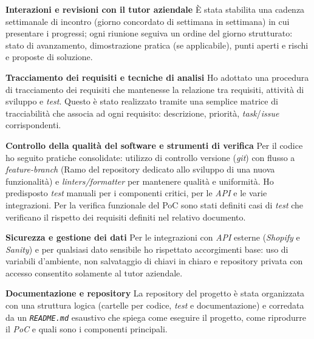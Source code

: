 \medskip
\noindent\textbf{Interazioni e revisioni con il tutor aziendale}
È stata stabilita una cadenza settimanale di incontro (giorno concordato di settimana in settimana) in cui presentare i progressi; 
ogni riunione seguiva un ordine del giorno strutturato: stato di avanzamento, dimostrazione pratica (se applicabile), punti aperti e rischi e proposte di soluzione.

\medskip
\noindent\textbf{Tracciamento dei requisiti e tecniche di analisi}
Ho adottato una procedura di tracciamento dei requisiti che mantenesse la relazione tra requisiti, attività di sviluppo e \emph{test}. 
Questo è stato realizzato tramite una semplice matrice di tracciabilità che associa ad ogni requisito: descrizione, priorità, \emph{task}/\emph{issue} corrispondenti.

\medskip
\noindent\textbf{Controllo della qualità del software e strumenti di verifica}
Per il codice ho seguito pratiche consolidate: utilizzo di controllo versione 
(\emph{git}) con flusso a \emph{feature-branch} (Ramo del repository dedicato allo sviluppo di una nuova funzionalità) e \emph{linters/formatter} per mantenere qualità e uniformità. 
Ho predisposto \emph{test} manuali per i componenti critici, per le \emph{API} e le varie integrazioni. 
Per la verifica funzionale del PoC sono stati definiti casi di \emph{test} che verificano il rispetto dei requisiti definiti nel relativo documento.

\medskip
\noindent\textbf{Sicurezza e gestione dei dati}
Per le integrazioni con \emph{API} esterne (\emph{Shopify} e \emph{Sanity}) e per qualsiasi dato sensibile ho rispettato accorgimenti base: 
uso di variabili d'ambiente, non salvataggio di chiavi in chiaro e repository privata con accesso consentito solamente al tutor aziendale.

\medskip
\noindent\textbf{Documentazione e repository}
La repository del progetto è stata organizzata con una struttura logica (cartelle per codice, \emph{test} e documentazione) 
e corredata da un \texttt{\emph{README.md}} esaustivo che spiega come eseguire il progetto, come riprodurre il \emph{PoC} e quali sono i componenti principali.





